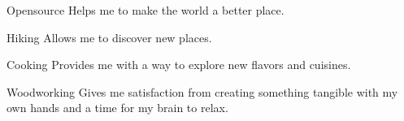 
\begin{cvskills}

  \cvskill
    {Opensource} %
    {Helps me to make the world a better place.} %

  \cvskill
    {Hiking} %
    {Allows me to discover new places.} %

  \cvskill
    {Cooking} %
    {Provides me with a way to explore new flavors and cuisines.} %

  \cvskill
    {Woodworking} %
    {Gives me satisfaction from creating something tangible with my own hands and a time for my brain to relax.} %

\end{cvskills}

